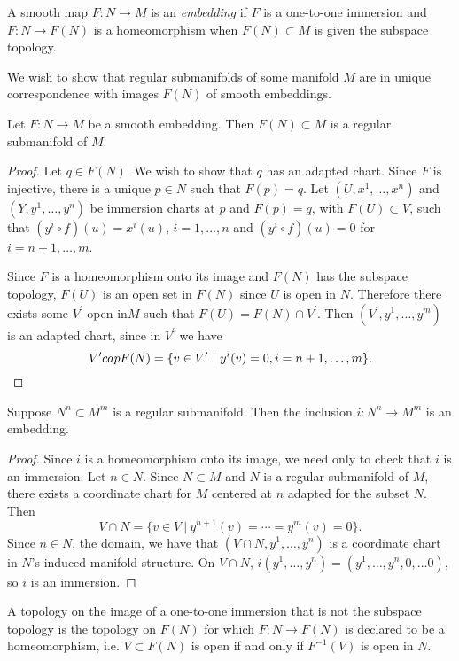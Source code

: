 \begin{defn}
A smooth map $F: N \to M$ is an \emph{embedding} if $F$ is a
one-to-one immersion and $F : N \to F(N)$ is a homeomorphism when
$F(N) \subset M$ is given the subspace topology.
\end{defn}

We wish to show that regular submanifolds of some manifold $M$ are in
unique correspondence with images $F(N)$ of smooth embeddings.

\begin{prop}
Let $F: N \to M$ be a smooth embedding. Then $F(N) \subset M$ is a
regular submanifold of $M$.
\end{prop}

\begin{proof}
Let $q \in F(N)$. We wish to show that $q$ has an adapted chart.
Since $F$ is injective, there is a unique $p \in N$ such that
$F(p) = q$. Let $(U, x^1, \dots, x^n)$ and $(Y, y^1, \dots, y^n)$ be
immersion charts at $p$ and $F(p) = q$, with $F(U) \subset V$, such that
$(y^i \circ f)(u) = x^i(u)$, $i = 1, \dots, n$
and $(y^i \circ f)(u) = 0$ for $i = n+1, \dots, m$.

Since $F$ is a homeomorphism onto its image and $F(N)$ has the
subspace topology, $F(U)$ is an open set in $F(N)$ since $U$ is open
in $N$. Therefore there exists some $V^\prime$ open in$M$ such that
$F(U) = F(N) \cap V^\prime$. Then $(V^\prime, y^1, \dots, y^m)$ is an
adapted chart, since in $V^\prime$ we have
$$
  V^\prime \\cap F(N)
= \{ v \in V^\prime ~\vert~ y^i(v) = 0, i = n+1, \dots, m \}.
$$
\end{proof}

\begin{prop}
Suppose $N^n \subset M^m$ is a regular submanifold. Then the inclusion
$i : N^n \to M^m$ is an embedding.
\end{prop}

\begin{proof}
Since $i$ is a homeomorphism onto its image, we need only to check
that $i$ is an immersion. Let $n \in N$. Since $N \subset M$ and $N$ is a regular
submanifold of $M$, there exists a coordinate chart for $M$ centered
at $n$ adapted for the subset $N$. Then
$$
  V \cap N
= \{ v \in V ~\vert~ y^{n+1}(v) = \cdots = y^m(v) = 0 \}.
$$
Since $n \in N$, the domain, we have that
$(V \cap N, y^1, \dots, y^n)$ is a coordinate chart in $N$'s induced
manifold structure. On $V \cap N$,
$i(y^1, \dots, y^n) = (y^1, \dots, y^n, 0, \dots 0)$, so $i$ is an immersion.
\end{proof}

A topology on the image of a one-to-one immersion that is not the
subspace topology is the topology on $F(N)$ for which
$F: N \to F(N)$ is declared to be a homeomorphism, i.e.
$V \subset F(N)$ is open if and only if $F^{-1}(V)$ is open in $N$.